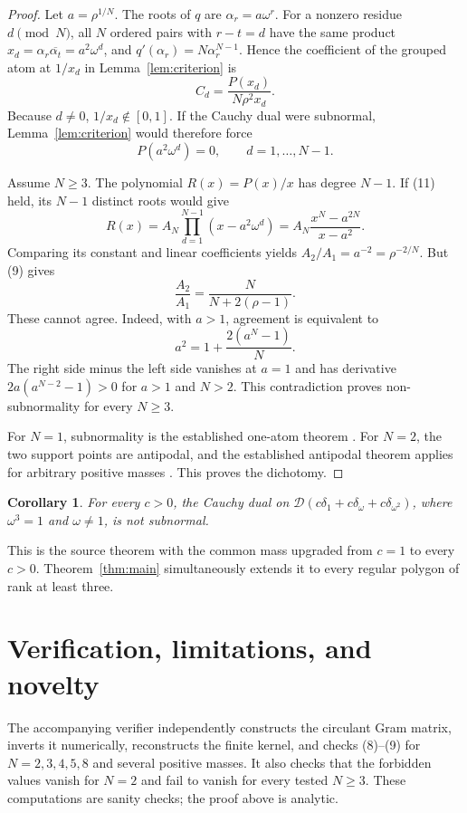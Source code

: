 \documentclass[11pt]{article}
\newtheorem{corollary}[theorem]{Corollary}
\newcommand{\cD}{\mathscr D}
\begin{document}
\begin{proof}
Let $a=\rho^{1/N}$.  The roots of $q$ are
$\alpha_r=a\omega^r$.  For a nonzero residue $d\pmod N$, all $N$ ordered
pairs with $r-t=d$ have the same product
$x_d=\alpha_r\overline{\alpha_t}=a^2\omega^d$, and
$q'(\alpha_r)=N\alpha_r^{N-1}$.  Hence the coefficient of the grouped atom
at $1/x_d$ in Lemma~\ref{lem:criterion} is
\[
 C_d=\frac{P(x_d)}{N\rho^2x_d}.                               \tag{10}
\]
Because $d\ne0$, $1/x_d\notin[0,1]$.  If the Cauchy dual were subnormal,
Lemma~\ref{lem:criterion} would therefore force
\[
 P(a^2\omega^d)=0,\qquad d=1,\ldots,N-1.                    \tag{11}
\]

Assume $N\ge3$.  The polynomial $R(x)=P(x)/x$ has degree $N-1$.
If (11) held, its $N-1$ distinct roots would give
\[
 R(x)=A_N\prod_{d=1}^{N-1}(x-a^2\omega^d)
 =A_N\frac{x^N-a^{2N}}{x-a^2}.
\]
Comparing its constant and linear coefficients yields
$A_2/A_1=a^{-2}=\rho^{-2/N}$.  But (9) gives
\[
 \frac{A_2}{A_1}=\frac{N}{N+2(\rho-1)}.                      \tag{12}
\]
These cannot agree.  Indeed, with $a>1$, agreement is equivalent to
\[
 a^2=1+\frac{2(a^N-1)}{N}.
\]
The right side minus the left side vanishes at $a=1$ and has derivative
$2a(a^{N-2}-1)>0$ for $a>1$ and $N>2$.  This contradiction proves
non-subnormality for every $N\ge3$.

For $N=1$, subnormality is the established one-atom theorem
\cite[Corollary~5.4]{CGR}.  For $N=2$, the two support points are antipodal,
and the established antipodal theorem applies for arbitrary positive masses
\cite[Theorem~2.4]{CGR}.  This proves the dichotomy.
\end{proof}

\begin{corollary}
For every $c>0$, the Cauchy dual on
\(\cD(c\delta_1+c\delta_\omega+c\delta_{\omega^2})\),
where $\omega^3=1$ and $\omega\ne1$, is not subnormal.
\end{corollary}

This is the source theorem with the common mass upgraded from $c=1$ to every
$c>0$.  Theorem~\ref{thm:main} simultaneously extends it to every regular
polygon of rank at least three.

\section{Verification, limitations, and novelty}

The accompanying verifier independently constructs the circulant Gram matrix,
inverts it numerically, reconstructs the finite kernel, and checks (8)--(9)
for $N=2,3,4,5,8$ and several positive masses.  It also checks that the
forbidden values vanish for $N=2$ and fail to vanish for every tested
$N\ge3$.  These computations are sanity checks; the proof above is analytic.
\end{document}

